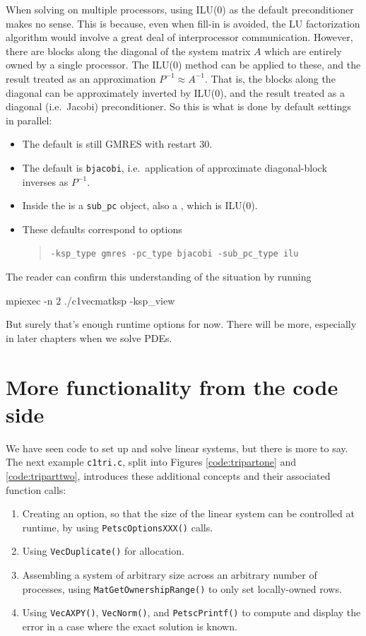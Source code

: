 When solving on multiple processors, using ILU($0$) as the default preconditioner makes no sense.  This is because, even when fill-in is avoided, the LU factorization algorithm would involve a great deal of interprocessor communication.  However, there are blocks along the diagonal of the system matrix $A$ which are entirely owned by a single processor.  The ILU($0$) method can be applied to these, and the result treated as an approximation $P^{-1}\approx A^{-1}$.  That is, the blocks along the diagonal can be approximately inverted by ILU($0$), and the result treated as a diagonal (i.e.~Jacobi) preconditioner.  So this is what is done by default \PETSc \pKSP settings in parallel:
\begin{itemize}
\item The default \pKSP is still GMRES with restart 30.
\item The default \pPC is \texttt{bjacobi}, i.e.~application of approximate diagonal-block inverses as $P^{-1}$.
\item Inside the \pPC is a \texttt{sub\_pc} object, also a \pPC, which is ILU($0$).
\item These defaults correspond to options
\begin{quote}
\texttt{-ksp\_type gmres -pc\_type bjacobi -sub\_pc\_type ilu}
\end{quote}
\end{itemize}
The reader can confirm this understanding of the situation by running
\begin{cline}
mpiexec -n 2 ./c1vecmatksp -ksp_view
\end{cline}
But surely that's enough runtime options for now.  There will be more, especially in later chapters when we solve PDEs.

\vfill
\newpage
\section{More \PETSc functionality from the code side}

We have seen \PETSc code to set up and solve linear systems, but there is more to say.  The next example \texttt{c1tri.c}, split into Figures \ref{code:tripartone} and \ref{code:triparttwo}, introduces these additional concepts and their associated function calls:
\begin{enumerate}
\item Creating an option, so that the size of the linear system can be controlled at runtime, by using \texttt{PetscOptionsXXX()} calls.
\item Using \texttt{VecDuplicate()} for allocation.
\item Assembling a system of arbitrary size across an arbitrary number of processes, using \texttt{MatGetOwnershipRange()} to only set locally-owned rows.
\item Using \texttt{VecAXPY()}, \texttt{VecNorm()}, and \texttt{PetscPrintf()} to compute and display the error in a case where the exact solution is known.
\end{enumerate}

